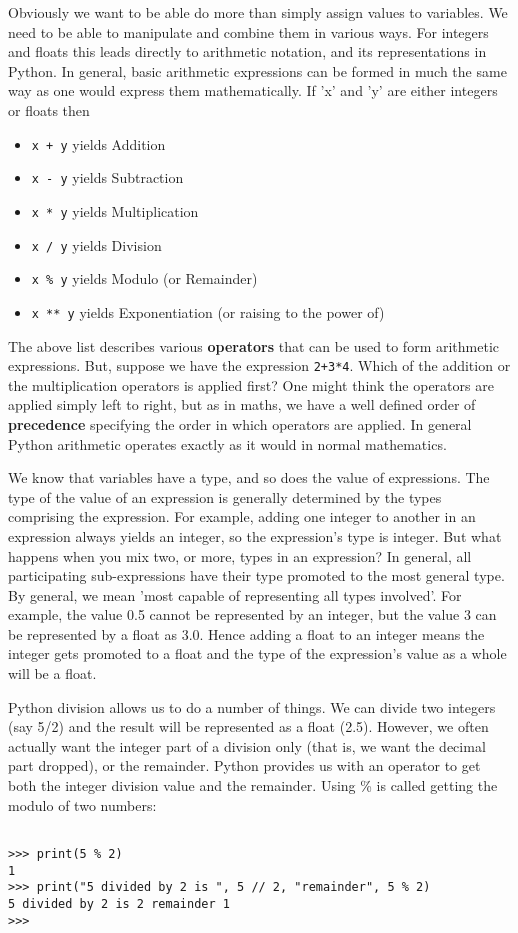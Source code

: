 Obviously we want to be able do more than simply assign values to   variables. We need to be able to manipulate and combine them in various   ways. For integers and floats this leads directly to arithmetic   notation, and its representations in Python. In general, basic arithmetic expressions can be formed in much the same way as one would express them mathematically. If 'x' and 'y' are either   integers or floats then
\begin{itemize}
	\item 
\texttt{x + y} yields Addition
	\item 
\texttt{x - y} yields Subtraction
	\item 
\texttt{x * y} yields Multiplication
	\item 
\texttt{x / y} yields Division
	\item 
\texttt{x \% y} yields Modulo (or Remainder)
	\item 
\texttt{x ** y} yields Exponentiation (or raising to the power of)
\end{itemize}

The above list describes various \textbf{operators} that can   be used to form arithmetic expressions. But, suppose we have the   expression 
\texttt{2+3*4}. Which of the addition or the   multiplication operators is applied first? One might think the   operators are applied simply left to right, but as in maths, we   have a well defined order of \textbf{precedence} specifying   the order in which operators are applied.    In general Python arithmetic operates exactly as it would in normal   mathematics.

We know that variables have a type, and so does the value of expressions.   The type of the value of an   expression is generally determined by the types comprising the   expression. For example, adding one integer to another in an expression   always yields an integer, so the expression's type is integer. But what   happens when you mix two, or more, types in an expression? In general,   all participating sub-expressions have their type promoted to the most   general type. By general, we mean 'most capable of representing all   types involved'. For example, the value 0.5 cannot be represented by an   integer, but the value 3 can be represented by a float as 3.0. Hence   adding a float to an integer means the integer gets promoted to a float   and the type of the expression's value as a whole will be a float.   

Python division allows us to do a number of things. We can divide two integers (say 5/2) and the result will be represented     as a float (2.5). However, we often actually want the integer part of a division only (that is, we want the decimal part dropped),   or the remainder. Python provides us with an operator to   get both the integer division value and the remainder. Using \% is called getting the modulo of two numbers:
\begin{lstlisting}

>>> print(5 % 2)
1
>>> print("5 divided by 2 is ", 5 // 2, "remainder", 5 % 2)
5 divided by 2 is 2 remainder 1
>>>
\end{lstlisting}

